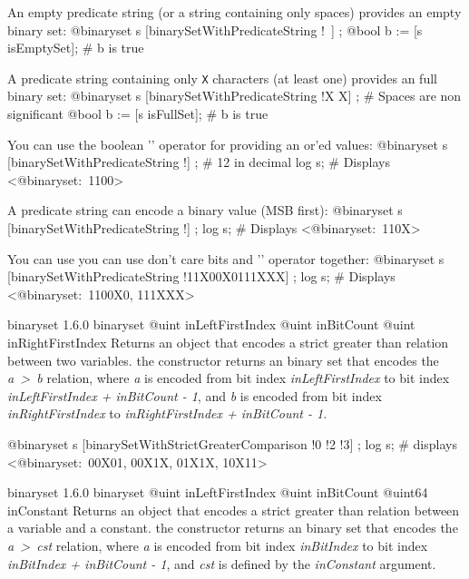 \exempleDeuxLignes
{An empty predicate string (or a string containing only spaces) provides an empty binary set:}
{@binaryset s [binarySetWithPredicateString !\textquotedbl~\textquotedbl] ;}
{@bool b := [s isEmptySet]; \# b is true}


\exempleDeuxLignes
{A predicate string containing only \texttt{\textquotesingle X\textquotesingle} characters (at least one) provides an full binary set:}
{@binaryset s [binarySetWithPredicateString !\textquotedbl X X\textquotedbl] ; \# Spaces are non significant}
{@bool b := [s isFullSet]; \# b is true}


\exempleDeuxLignes
{You can use the boolean '\textbar' operator for providing an or'ed values:}
{@binaryset s [binarySetWithPredicateString !\textquotedbl] ; \# 12 in decimal}
{log s; \# Displays <@binaryset:~1100>}


\exempleDeuxLignes
{A predicate string can encode a binary value (MSB first):}
{@binaryset s [binarySetWithPredicateString !\textquotedbl] ;}
{log s; \# Displays <@binaryset:~110X>}



\exempleDeuxLignes
{You can use you can use don't care bits and '\textbar' operator together:}
{@binaryset s [binarySetWithPredicateString !\textquotedbl 11X00X0\textbar 111XXX\textquotedbl] ;}
{log s; \# Displays <@binaryset:~1100X0, 111XXX>}





{binaryset}
{1.6.0}
{binaryset}
{@uint inLeftFirstIndex}
{@uint inBitCount}
{@uint inRightFirstIndex}
{Returns an  object that encodes a strict greater than relation between two variables.}
{the constructor returns an binary set that encodes the \emph{a~>~b} relation, where \emph{a} is encoded from bit index \emph{inLeftFirstIndex} to bit index \emph{inLeftFirstIndex  + inBitCount - 1}, and \emph{b} is encoded from bit index \emph{inRightFirstIndex} to \emph{inRightFirstIndex + inBitCount - 1}.}

\exempleDeuxLignes
{}
{@binaryset s [binarySetWithStrictGreaterComparison !0 !2 !3] ;}
{log s; \# displays <@binaryset:~00X01, 00X1X, 01X1X, 10X11>}





{binaryset}
{1.6.0}
{binaryset}
{@uint inLeftFirstIndex}
{@uint inBitCount}
{@uint64 inConstant}
{Returns an  object that encodes a strict greater than relation between a variable and a constant.}
{the constructor returns an binary set that encodes the \emph{a~>~cst} relation, where \emph {a} is encoded from bit index \emph{inBitIndex} to bit index \emph{inBitIndex  + inBitCount - 1}, and \emph{cst} is defined by the \emph{inConstant} argument.}





